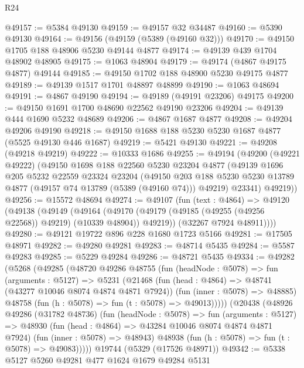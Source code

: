 \begin{lexlean}{R24}
\begin{coremodule}
@49157 := @5384 @49130
@49159 := @49157 @32 @34487
@49160 := @5390 @49130
@49164 := @49156 (@49159 (@5389 (@49160 @32)))
@49170 := @49150 @1705 @188 @48906 @5230 @49144 @4877
@49174 := @49139 @439 @1704 @48902 @48905
@49175 := @1063 @48904
@49179 := @49174 (@4867 @49175 @4877) @49144
@49185 := @49150 @1702 @188 @48900 @5230 @49175 @4877
@49189 := @49139 @1517 @1701 @48897 @48899
@49190 := @1063 @48694
@49191 := @4867 @49190
@49194 := @49189 (@49191 @23206) @49175
@49200 := @49150 @1691 @1700 @48690 @22562 @49190 @23206
@49204 := @49139 @444 @1690 @5232 @48689
@49206 := @4867 @1687 @4877
@49208 := @49204 @49206 @49190
@49218 := @49150 @1688 @188 @5230 @5230 @1687 @4877 (@5525 @49130 @446 @1687)
@49219 := @5421 @49130
@49221 := @49208 (@49218 @49219)
@49222 := @10333 @1686
@49255 := @49194
    (@49200
      (@49221 @49222)
      (@49150
        @1698
        @188
        @22560
        @5230
        @23204
        @4877
        (@49139
          @1696
          @205
          @5232
          @22559
          @23324
          @23204
          (@49150
            @203
            @188
            @5230
            @5230
            @13789
            @4877
            (@49157 @74 @13789 (@5389 (@49160 @74)))
            @49219)
          @23341)
        @49219))
@49256 := @15572 @48694
@49274 := @49107
    (fun (text : @4864) =>
    @49120
      (@49138
        (@49149
          (@49164 (@49170 (@49179 (@49185 (@49255 (@49256 @22568)) @49219) (@10339 @48904)) @49219))
          (@32267 @7924 @48911))))
@49280 := @49121 @19722 @896 @228 @1680 @1723 @5166
@49281 := @17505 @48971
@49282 := @49280 @49281
@49283 := @48714 @5435
@49284 := @5587 @49283
@49285 := @5229 @49284
@49286 := @48721 @5435
@49334 := @49282
    (@5268
      (@49285
        (@48720
          @49286
          @48755
          (fun (headNode : @5078) =>
          fun (arguments : @5127) =>
          @5231
            (@21468
              (fun (head : @4864) => @48741 (@43277 @10046 @8074 @4874 @4871 @7924))
              (fun (inner : @5078) => @48885)
              @48758
              (fun (h : @5078) => fun (t : @5078) => @49013)))))
      (@20438
        (@48926
          @49286
          (@31782 @48736)
          (fun (headNode : @5078) =>
          fun (arguments : @5127) =>
          @48930
            (fun (head : @4864) => @43284 @10046 @8074 @4874 @4871 @7924)
            (fun (inner : @5078) => @48943)
            @48938
            (fun (h : @5078) => fun (t : @5078) => @49083)))))
    @19744
    (@5329 (@17526 @48971))
@49342 := @5338 @5127 @5260 @49281 @477 @1624 @1679 @49284 @5131

\end{coremodule}
\end{lexlean}
